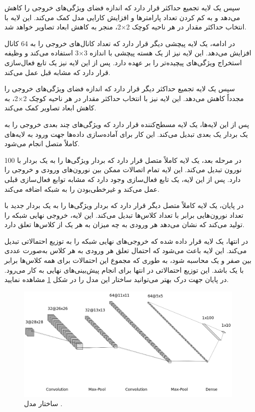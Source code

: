 سپس یک لایه تجمیع حداکثر%
قرار دارد که اندازه فضای ویژگی‌های خروجی را کاهش می‌دهد و به کم کردن تعداد پارامترها و افزایش کارایی مدل کمک می‌کند. این لایه با انتخاب حداکثر مقدار در هر ناحیه کوچک
2$\times$2،
منجر به کاهش ابعاد تصاویر خواهد شد.

در ادامه، یک لایه پیچشی دیگر قرار دارد که تعداد کانال‌های خروجی را به 64 کانال افزایش می‌دهد. این لایه نیز از یک هسته پیچشی با اندازه
3$\times$3
استفاده می‌کند و وظیفه استخراج ویژگی‌های پیچیده‌تر را بر عهده دارد. پس از این لایه نیز یک تابع فعال‌سازی
قرار دارد که مشابه قبل عمل می‌کند.

سپس یک لایه تجمیع حداکثر دیگر قرار دارد که اندازه فضای ویژگی‌های خروجی را مجدداً کاهش می‌دهد. این لایه نیز با انتخاب حداکثر مقدار در هر ناحیه کوچک
2$\times$2،
به کاهش ابعاد تصاویر کمک می‌کند.

پس از این لایه‌ها، یک لایه مسطح‌کننده قرار دارد که ویژگی‌های چند بعدی خروجی را به یک بردار یک بعدی تبدیل می‌کند. این کار برای آماده‌سازی داده‌ها جهت ورود به لایه‌های کاملاً متصل انجام می‌شود.

در مرحله بعد، یک لایه کاملاً متصل قرار دارد که بردار ویژگی‌ها را به یک بردار با 100 نورون تبدیل می‌کند. این لایه تمام اتصالات ممکن بین نورون‌های ورودی و خروجی را دارد. پس از این لایه، یک تابع فعال‌سازی
وجود دارد که مشابه توابع فعال‌سازی قبلی عمل می‌کند و غیرخطی‌بودن را به شبکه اضافه می‌کند.

در پایان، یک لایه کاملاً متصل دیگر قرار دارد که بردار ویژگی‌ها را به یک بردار جدید با تعداد نورون‌هایی برابر با تعداد کلاس‌ها تبدیل می‌کند. این لایه، خروجی نهایی شبکه را تولید می‌کند که نشان می‌دهد هر ورودی به چه میزان به هر یک از کلاس‌ها تعلق دارد.

در انتها، یک لایه
قرار داده شده که خروجی‌های نهایی شبکه را به توزیع احتمالاتی تبدیل می‌کند. این لایه باعث می‌شود که احتمال تعلق هر ورودی به هر کلاس به‌صورت عددی بین صفر و یک محاسبه شود، به طوری که مجموع این احتمالات برای همه کلاس‌ها برابر با یک باشد. این توزیع احتمالاتی در انتها برای انجام پیش‌بینی‌های نهایی به کار می‌رود. در پایان جهت درک بهتر می‌توانید ساختار این مدل را در شکل
\ref{cnn}
مشاهده نمایید.


\begin{figure}[b!]
	\centering
	\includegraphics[scale=0.463]{images/chap5/cnn.png}%
	\caption{
		ساختار مدل 
		.
	}
	\label{cnn}
	\centering
\end{figure}




